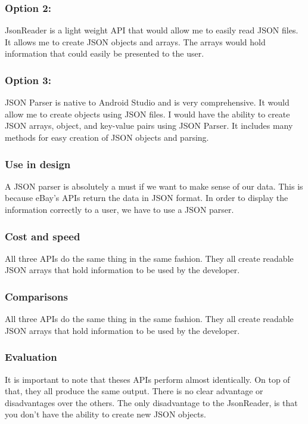 \documentclass[journal,compsoc, 10pt, draftclsnofoot, onecolumn]{IEEEtran}
\begin{document}
\subsubsection*{Option 2: }
JsonReader is a light weight API that would allow me to easily read JSON files.
It allows me to create JSON objects and arrays. The arrays would hold
information that could easily be presented to the user.

\subsubsection*{Option 3: }
JSON Parser is native to Android Studio and is very comprehensive. It would
allow me to create objects using JSON files. I would have the ability to create
JSON arrays, object, and key-value pairs using JSON Parser. It includes many
methods for easy creation of JSON objects and parsing.

\subsubsection*{Use in design}
A JSON parser is absolutely a must if we want to make sense of our data. This is
because eBay's APIs return the data in JSON format. In order to display the
information correctly to a user, we have to use a JSON parser.

\subsubsection*{Cost and speed}
All three APIs do the same thing in the same fashion. They all create readable
JSON arrays that hold information to be used by the developer.

\subsubsection*{Comparisons}
All three APIs do the same thing in the same fashion. They all create readable
JSON arrays that hold information to be used by the developer.

\subsubsection*{Evaluation}
It is important to note that theses APIs perform almost identically. On top of
that, they all produce the same output. There is no clear advantage or
disadvantages over the others. The only disadvantage to the JsonReader, is that
you don't have the ability to create new JSON objects.
\end{document}

